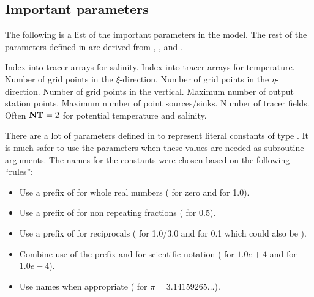 \subsection{Important parameters}
The following is a list of the important parameters in the model.  The
rest of the parameters defined in  are derived from
, , and .
\begin{klist}
   Index into tracer arrays for salinity.
   Index into tracer arrays for temperature.
   Number of grid points in the $\xi$-direction.
   Number of grid points in the $\eta$-direction.
   Number of grid points in the vertical.
   Maximum number of output station points.
   Maximum number of point sources/sinks.
   Number of tracer fields.  Often $\mbox{\bf NT}=2$ for
    potential temperature and salinity.
\end{klist}
There are a lot of parameters defined in  to represent
literal constants of type .  It is much safer to use
the parameters when these values are needed as subroutine arguments.
The names for the constants were chosen based on the following
``rules'':
\begin{itemize}
  \item Use a prefix of  for whole real numbers ( for
    zero and  for 1.0).
  \item Use a prefix of  for non repeating fractions
    ( for 0.5).
  \item Use a prefix of  for reciprocals ( for 1.0/3.0
    and  for 0.1 which could also be ).
  \item Combine use of the prefix and  for scientific notation
    ( for $1.0e+4$ and  for $1.0e-4$).
  \item Use names when appropriate ( for
    $\pi = 3.14159265\ldots$).
\end{itemize}

